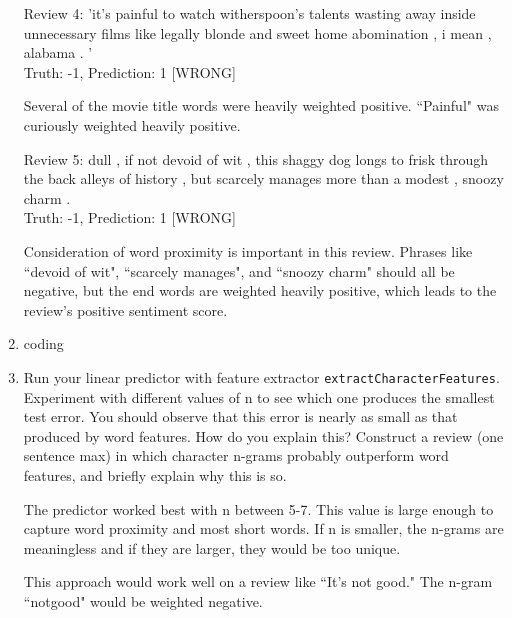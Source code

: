 \documentclass[10pt]{article}
\begin{document}
\begin{enumerate}[label=(\alph*)]
	Review 4: 'it's painful to watch witherspoon's talents wasting away inside unnecessary films like legally blonde and sweet home abomination , i mean , alabama . '\\
Truth: -1, Prediction: 1 [WRONG]

	Several of the movie title words were heavily weighted positive. ``Painful" was curiously weighted heavily positive.

	Review 5: dull , if not devoid of wit , this shaggy dog longs to frisk through the back alleys of history , but scarcely manages more than a modest , snoozy charm .\\
Truth: -1, Prediction: 1 [WRONG]

	Consideration of word proximity is important in this review. Phrases like ``devoid of wit", ``scarcely manages", and ``snoozy charm" should all be negative, but the end words are weighted heavily positive, which leads to the review's positive sentiment score.
	
	\item coding
	
	\item Run your linear predictor with feature extractor \texttt{extractCharacterFeatures}. Experiment with different values of n to see which one produces the smallest test error. You should observe that this error is nearly as small as that produced by word features. How do you explain this? Construct a review (one sentence max) in which character n-grams probably outperform word features, and briefly explain why this is so.
	
	The predictor worked best with n between 5-7. This value is large enough to capture word proximity and most short words. If n is smaller, the n-grams are meaningless and if they are larger, they would be too unique.
	
	This approach would work well on a review like ``It's not good." The n-gram ``notgood" would be weighted negative. 

\end{enumerate}
\end{document}
